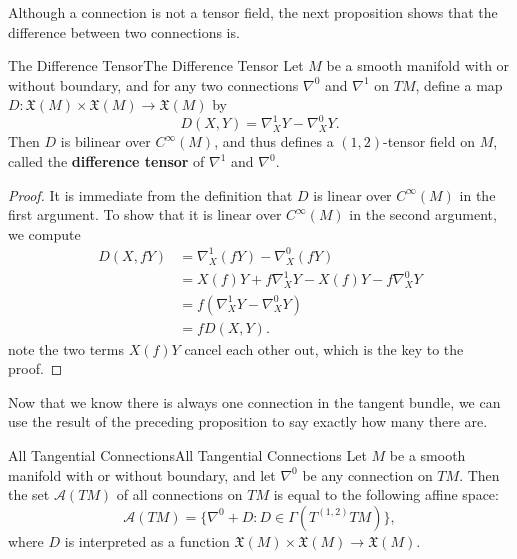 \documentclass[../main.tex]{subfiles}
\begin{document}
Although a connection is not a tensor field, the next proposition shows that the difference between two connections is.
\begin{proposition}{The Difference Tensor}{The Difference Tensor}
	Let $M$ be a smooth manifold with or without boundary, and for any two connections $\nabla^0$ and $\nabla^1$ on $TM$, define a map $D: \mathfrak{X}(M) \times \mathfrak{X}(M) \to \mathfrak{X}(M)$ by
	\begin{equation}
		D(X, Y) = \nabla^1_X Y - \nabla^0_X Y.
	\end{equation}
	Then $D$ is bilinear over $C^{\infty}(M)$, and thus defines a $(1, 2)$-tensor field on $M$, called the \textbf{difference tensor} of $\nabla^1$ and $\nabla^0$.
\end{proposition}
\begin{proof}
	It is immediate from the definition that $D$ is linear over $C^{\infty}(M)$ in the first argument. To show that it is linear over $C^{\infty}(M)$ in the second argument, we compute
	\begin{equation*}
		\begin{aligned}
			D(X, f Y) & = \nabla^1_X (f Y) - \nabla^0_X (f Y)               \\
			          & = X(f) Y + f \nabla^1_X Y - X(f) Y - f \nabla^0_X Y \\
			          & = f (\nabla^1_X Y - \nabla^0_X Y)                   \\
			          & = f D(X, Y).
		\end{aligned}
	\end{equation*}
	note the two terms $X(f) Y$ cancel each other out, which is the key to the proof.
\end{proof}

Now that we know there is always one connection in the tangent bundle, we can use the result of the preceding proposition to say exactly how many there are.

\begin{theorem}{All Tangential Connections}{All Tangential Connections}
	Let $M$ be a smooth manifold with or without boundary, and let $\nabla^0$ be any connection on $TM$. Then the set $\mathscr{A}(TM)$ of all connections on $TM$ is equal to the following affine space:
	\begin{equation}
		\mathscr{A}(TM) = \{\nabla^0 + D: D \in \Gamma(T^{(1, 2)} TM)\},
	\end{equation}
	where $D$ is interpreted as a function $\mathfrak{X}(M) \times \mathfrak{X}(M) \to \mathfrak{X}(M)$.
\end{theorem}
\end{document}
